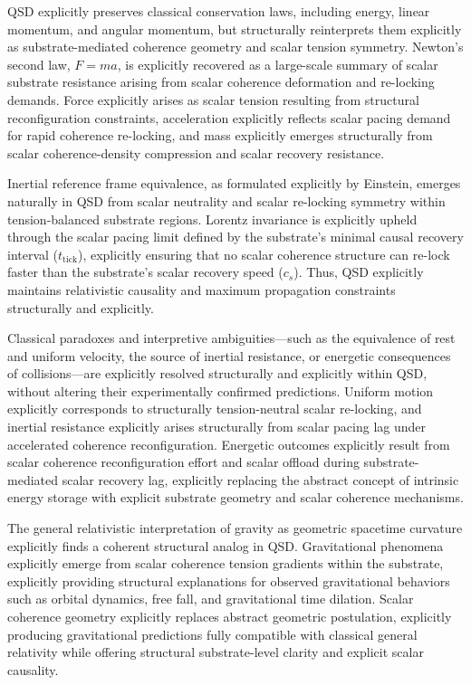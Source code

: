 \documentclass[preprints,article,submit,pdftex,moreauthors]{Definitions/mdpi}
\begin{document}
QSD explicitly preserves classical conservation laws, including energy, linear momentum, and angular momentum, but structurally reinterprets them explicitly as substrate-mediated coherence geometry and scalar tension symmetry. Newton’s second law, \(F = ma\), is explicitly recovered as a large-scale summary of scalar substrate resistance arising from scalar coherence deformation and re-locking demands. Force explicitly arises as scalar tension resulting from structural reconfiguration constraints, acceleration explicitly reflects scalar pacing demand for rapid coherence re-locking, and mass explicitly emerges structurally from scalar coherence-density compression and scalar recovery resistance.

Inertial reference frame equivalence, as formulated explicitly by Einstein, emerges naturally in QSD from scalar neutrality and scalar re-locking symmetry within tension-balanced substrate regions. Lorentz invariance is explicitly upheld through the scalar pacing limit defined by the substrate's minimal causal recovery interval (\(t_{\text{tick}}\)), explicitly ensuring that no scalar coherence structure can re-lock faster than the substrate’s scalar recovery speed (\(c_s\)). Thus, QSD explicitly maintains relativistic causality and maximum propagation constraints structurally and explicitly.

Classical paradoxes and interpretive ambiguities—such as the equivalence of rest and uniform velocity, the source of inertial resistance, or energetic consequences of collisions—are explicitly resolved structurally and explicitly within QSD, without altering their experimentally confirmed predictions. Uniform motion explicitly corresponds to structurally tension-neutral scalar re-locking, and inertial resistance explicitly arises structurally from scalar pacing lag under accelerated coherence reconfiguration. Energetic outcomes explicitly result from scalar coherence reconfiguration effort and scalar offload during substrate-mediated scalar recovery lag, explicitly replacing the abstract concept of intrinsic energy storage with explicit substrate geometry and scalar coherence mechanisms.

The general relativistic interpretation of gravity as geometric spacetime curvature explicitly finds a coherent structural analog in QSD. Gravitational phenomena explicitly emerge from scalar coherence tension gradients within the substrate, explicitly providing structural explanations for observed gravitational behaviors such as orbital dynamics, free fall, and gravitational time dilation. Scalar coherence geometry explicitly replaces abstract geometric postulation, explicitly producing gravitational predictions fully compatible with classical general relativity while offering structural substrate-level clarity and explicit scalar causality.
\end{document}
